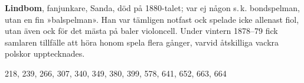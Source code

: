\textbf{Lindbom}, fanjunkare, Sanda, död på 1880-talet; var ej någon s.\,k. bondspelman, utan en fin »balspelman». Han var tämligen notfast ock spelade icke allenast fiol, utan även ock för det mästa på baler violoncell. Under vintern 1878--79 fick samlaren tillfälle att höra honom spela flera gånger, varvid åtskilliga vackra polskor upptecknades. 

218, 239, 266, 307, 340, 349, 380, 399, 578, 641, 652, 663, 664 
